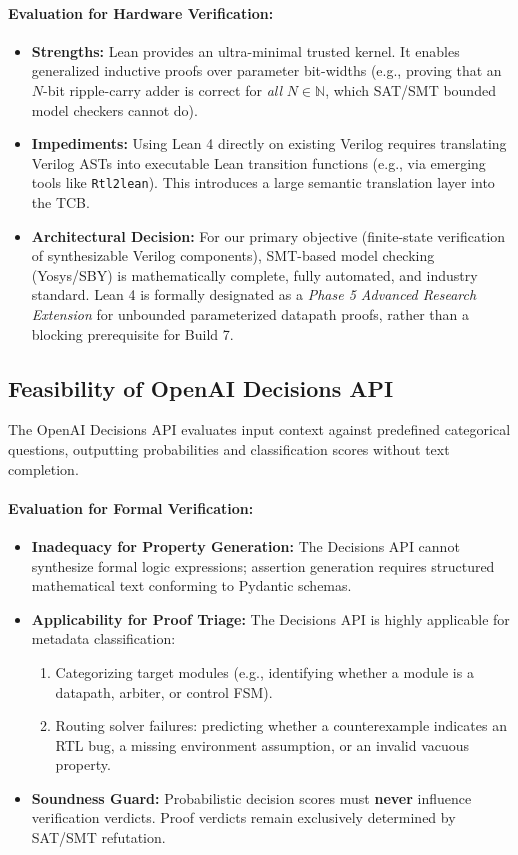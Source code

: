 \documentclass[11pt,a4paper]{article}
\begin{document}
\paragraph{Evaluation for Hardware Verification:}
\begin{itemize}
    \item \textbf{Strengths:} Lean provides an ultra-minimal trusted kernel. It enables generalized inductive proofs over parameter bit-widths (e.g., proving that an $N$-bit ripple-carry adder is correct for \textit{all} $N \in \mathbb{N}$, which SAT/SMT bounded model checkers cannot do).
    \item \textbf{Impediments:} Using Lean 4 directly on existing Verilog requires translating Verilog ASTs into executable Lean transition functions (e.g., via emerging tools like \texttt{Rtl2lean}). This introduces a large semantic translation layer into the TCB.
    \item \textbf{Architectural Decision:} For our primary objective (finite-state verification of synthesizable Verilog components), SMT-based model checking (Yosys/SBY) is mathematically complete, fully automated, and industry standard. Lean 4 is formally designated as a \textit{Phase 5 Advanced Research Extension} for unbounded parameterized datapath proofs, rather than a blocking prerequisite for Build 7.
\end{itemize}

\subsection{Feasibility of OpenAI Decisions API}
The OpenAI Decisions API evaluates input context against predefined categorical questions, outputting probabilities and classification scores without text completion.

\paragraph{Evaluation for Formal Verification:}
\begin{itemize}
    \item \textbf{Inadequacy for Property Generation:} The Decisions API cannot synthesize formal logic expressions; assertion generation requires structured mathematical text conforming to Pydantic schemas.
    \item \textbf{Applicability for Proof Triage:} The Decisions API is highly applicable for metadata classification:
    \begin{enumerate}[label=(\alph*)]
        \item Categorizing target modules (e.g., identifying whether a module is a datapath, arbiter, or control FSM).
        \item Routing solver failures: predicting whether a counterexample indicates an RTL bug, a missing environment assumption, or an invalid vacuous property.
    \end{enumerate}
    \item \textbf{Soundness Guard:} Probabilistic decision scores must \textbf{never} influence verification verdicts. Proof verdicts remain exclusively determined by SAT/SMT refutation.
\end{itemize}
\end{document}
